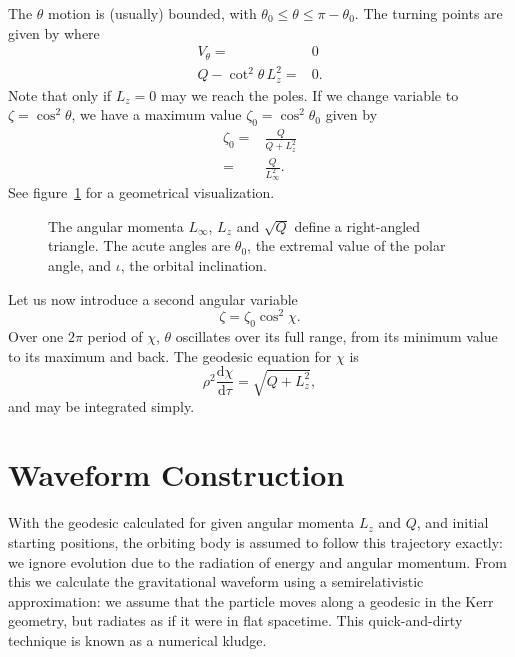 \documentclass[a4paper, 11pt, titlepage, twoside]{report}
\newcommand{\figref}[1]{figure~\ref{fig:#1}}
\newcommand{\dd}{\ensuremath{\mathrm{d}}}
\newcommand{\diff}[2]{\ensuremath{\frac{\dd {#1}}{\dd {#2}}}}
\begin{document}
The $\theta$ motion is (usually) bounded, with $\theta_0 \leq \theta \leq \pi - \theta_0$. The turning points are given by where
\begin{align}
V_\theta = {} & 0 \nonumber \\
Q - \cot^2\theta\, L_z^2= {} & 0.
\end{align}
Note that only if $L_z = 0$ may we reach the poles\cite{Wilkins1972}. If we change variable to $\zeta = \cos^2\theta$, we have a maximum value $\zeta_0 = \cos^2\theta_0$ given by
\begin{align}
\zeta_0 = {} & \frac{Q}{Q+L_z^2}\\
 = {} & \frac{Q}{L_\infty^2}.
\end{align}
See \figref{L_triangle} for a geometrical visualization.
\begin{figure}[htbp]
\begin{center}
    \caption{The angular momenta $L_\infty$, $L_z$ and $\sqrt{Q}$ define a right-angled triangle. The acute angles are $\theta_0$, the extremal value of the polar angle, and $\iota$, the orbital inclination\cite{Glampedakis2002a}.}
   \label{fig:L_triangle}
\end{center}
\end{figure}
Let us now introduce a second angular variable\cite{Drasco2004}
\begin{equation}
\zeta = \zeta_0\cos^2\chi.
\end{equation}
Over one $2\pi$ period of $\chi$, $\theta$ oscillates over its full range, from its minimum value to its maximum and back. The geodesic equation for $\chi$ is
\begin{equation}
\rho^2\diff{\chi}{\tau} = \sqrt{Q + L_z^2},
\end{equation}
and may be integrated simply.

\section{Waveform Construction}

With the geodesic calculated for given angular momenta $L_z$ and $Q$, and initial starting positions, the orbiting body is assumed to follow this trajectory exactly: we ignore evolution due to the radiation of energy and angular momentum. From this we calculate the gravitational waveform using a semirelativistic approximation\cite{Ruffini1981}: we assume that the particle moves along a geodesic in the Kerr geometry, but radiates as if it were in flat spacetime. This quick-and-dirty technique is known as a numerical kludge\cite{Babak2007}.
\end{document}
